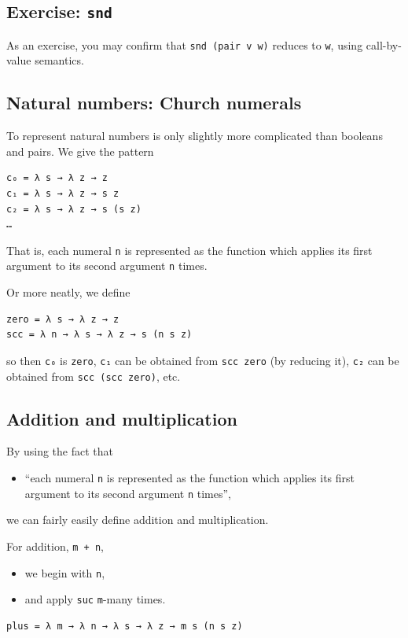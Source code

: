 \documentclass[11pt]{article}
\theoremstyle{definition}
\begin{document}
\subsection{Exercise: \texttt{snd}}
\label{sec:org7486301}

As an exercise, you may confirm
that \texttt{snd (pair v w)} reduces to \texttt{w}, using call-by-value semantics.

\subsection{Natural numbers: Church numerals}
\label{sec:org49dbf58}

To represent natural numbers is only slightly more complicated
than booleans and pairs. We give the pattern
\begin{verbatim}
c₀ = λ s → λ z → z
c₁ = λ s → λ z → s z
c₂ = λ s → λ z → s (s z)
…
\end{verbatim}
That is, each numeral \texttt{n} is represented as the function
which applies its first argument to its second argument \texttt{n} times.

Or more neatly, we define
\begin{verbatim}
zero = λ s → λ z → z
scc = λ n → λ s → λ z → s (n s z)
\end{verbatim}
so then \texttt{c₀} is \texttt{zero}, \texttt{c₁} can be obtained from \texttt{scc zero} (by reducing it),
\texttt{c₂} can be obtained from \texttt{scc (scc zero)}, etc.

\subsection{Addition and multiplication}
\label{sec:org5bdbb58}

By using the fact that
\begin{itemize}
\item “each numeral \texttt{n} is represented as the function which applies
its first argument to its second argument \texttt{n} times”,
\end{itemize}
we can fairly easily define addition and multiplication.

For addition, \texttt{m + n},
\begin{itemize}
\item we begin with \texttt{n},
\item and apply \texttt{suc} \texttt{m}-many times.
\end{itemize}
\begin{verbatim}
plus = λ m → λ n → λ s → λ z → m s (n s z)
\end{verbatim}
\end{document}
